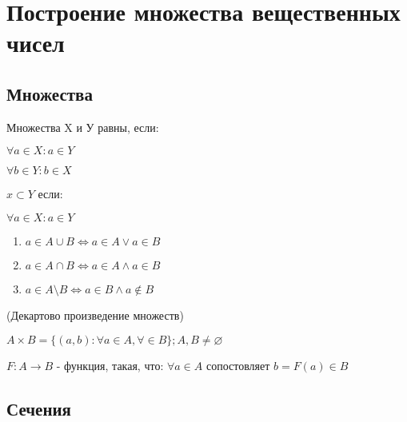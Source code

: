 

\chapter{Построение множества вещественных чисел}


\section{Множества}

\begin{definition}
    Множества X и У равны, если:
    
    $\forall a \in X: a \in Y$

    $\forall b \in Y: b \in X$
\end{definition}

\begin{definition}
    $x \subset Y$ если:
    
    $\forall a \in X: a \in Y$
\end{definition}

\begin{definition}
    \begin{enumerate}
        \item $a \in A \cup B \Leftrightarrow a \in A \lor a \in B$
        \item $a \in A \cap B \Leftrightarrow a \in A \land a \in B$
        \item $a \in A \setminus B \Leftrightarrow a \in B \land a \notin B$
    \end{enumerate}
\end{definition}

\begin{definition} (Декартово произведение множеств)
    
    $A \times B = \{(a, b): \forall a \in A, \forall \in B\}; A, B \neq \varnothing$
\end{definition}

\begin{definition}

    $F: A \rightarrow B$ - функция, такая, что: $\forall a \in A$ сопостовляет $b = F(a) \in B$
\end{definition}

\section{Сечения}

